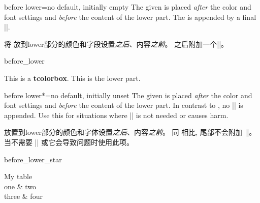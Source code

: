 \begin{docTcbKey}{before lower}{=}{no default, initially empty}
The given  is placed \emph{after} the color and font settings
and \emph{before} the content of the lower part.
The  is appended by a final |\ignorespaces|.

将  放到lower部分的颜色和字段设置\emph{之后}、内容\emph{之前}。
 之后附加一个|\ignorespaces|。
\begin{exdispExample}{before_lower}

\begin{tcolorbox}
This is a \textbf{tcolorbox}.
\tcblower
This is the lower part.
\end{tcolorbox}
\end{exdispExample}
\end{docTcbKey}


\begin{docTcbKey}[][doc new=2019-02-26]{before lower*}{=}{no default, initially unset}
The given  is placed \emph{after} the color and font settings
and \emph{before} the content of the lower part.
In contrast to , no |\ignorespaces| is appended.
Use this for situations where |\ignorespaces| is not needed or causes harm.

 放置到lower部分的颜色和字体设置\emph{之后}、内容\emph{之前}。
同  相比, 尾部不会附加 |\ignorespaces|。
当不需要 |\ignorespaces| 或它会导致问题时使用此项。
\begin{exdispExample}{before_lower_star}
\begin{tcolorbox}[size=small,bicolor,sidebyside,center lower,
colback=yellow!30,colbacklower=yellow!20,colframe=yellow!80!black,
before lower*=\begin{tabular}{cc},
after lower*=\end{tabular},
]
My table
\tcblower
{}\\
one & two \\
three & four\\
\end{tcolorbox}
\end{exdispExample}
\end{docTcbKey}






